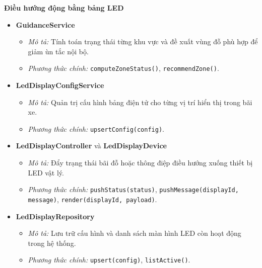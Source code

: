 \newpage
\noindent\textbf{Điều hướng động bằng bảng LED}
\begin{itemize}[leftmargin=1.5cm]
    \item \textbf{GuidanceService}
    \begin{itemize}
        \item \textit{Mô tả:} Tính toán trạng thái từng khu vực và đề xuất vùng đỗ phù hợp để giảm ùn tắc nội bộ.
        \item \textit{Phương thức chính:} \texttt{computeZoneStatus()}, \texttt{recommendZone()}.
    \end{itemize}

    \item \textbf{LedDisplayConfigService}
    \begin{itemize}
        \item \textit{Mô tả:} Quản trị cấu hình bảng điện tử cho từng vị trí hiển thị trong bãi xe.
        \item \textit{Phương thức chính:} \texttt{upsertConfig(config)}.
    \end{itemize}

    \item \textbf{LedDisplayController} và \textbf{LedDisplayDevice}
    \begin{itemize}
        \item \textit{Mô tả:} Đẩy trạng thái bãi đỗ hoặc thông điệp điều hướng xuống thiết bị LED vật lý.
        \item \textit{Phương thức chính:} \texttt{pushStatus(status)}, \texttt{pushMessage(displayId, message)}, \texttt{render(displayId, payload)}.
    \end{itemize}

    \item \textbf{LedDisplayRepository}
    \begin{itemize}
        \item \textit{Mô tả:} Lưu trữ cấu hình và danh sách màn hình LED còn hoạt động trong hệ thống.
        \item \textit{Phương thức chính:} \texttt{upsert(config)}, \texttt{listActive()}.
    \end{itemize}
\end{itemize}

